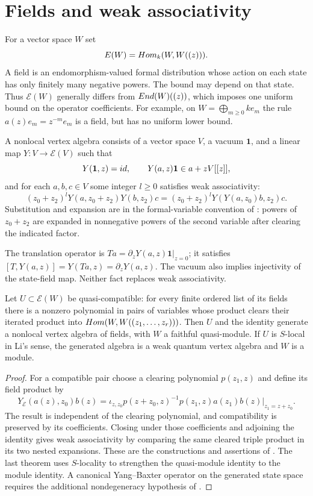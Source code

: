 \section{Fields and weak associativity}
For a vector space $W$ set
\[
 E(W)=Hom_k(W,W((z))).
\]
A field is an endomorphism-valued formal distribution whose action on each
state has only finitely many negative powers. The bound may depend on that state.
Thus $\mathcal E(W)$ generally differs from $End(W)((z))$, which imposes one
uniform bound on the operator coefficients.
For example, on $W=\bigoplus_{m\ge0}ke_m$ the rule
$a(z)e_m=z^{-m}e_m$ is a field, but has no uniform lower bound.

\begin{definition}
A nonlocal vertex algebra consists of a vector space $V$, a vacuum $\mathbf1$,
and a linear map $Y:V\to\mathcal E(V)$ such that
\[
 Y(\mathbf1,z)=id,
 \qquad Y(a,z)\mathbf1\in a+zV[[z]],
\]
and for each $a,b,c\in V$ some integer $l\ge0$ satisfies weak associativity:
\[
 (z_0+z_2)^lY(a,z_0+z_2)Y(b,z_2)c
 =(z_0+z_2)^lY(Y(a,z_0)b,z_2)c.
\]
Substitution and expansion are in the formal-variable convention of
\cite[Definition~2.3]{LiNonlocal}: powers of $z_0+z_2$ are expanded in
nonnegative powers of the second variable after clearing the indicated factor.
\end{definition}

The translation operator is
$Ta=\left.\partial_zY(a,z)\mathbf1\right|_{z=0}$; it satisfies
$[T,Y(a,z)]=Y(Ta,z)=\partial_zY(a,z)$.
The vacuum also implies injectivity of the state-field map.
Neither fact replaces weak associativity.

\begin{theorem}
Let $U\subset\mathcal E(W)$ be quasi-compatible: for every finite ordered
list of its fields there is a nonzero polynomial in pairs of variables whose
product clears their iterated product into
$Hom(W,W((z_1,\ldots,z_r)))$.
Then $U$ and the identity generate a nonlocal vertex algebra of fields, with
$W$ a faithful quasi-module. If $U$ is $S$-local in Li's sense, the generated
algebra is a weak quantum vertex algebra and $W$ is a module.
\end{theorem}
\begin{proof}
For a compatible pair choose a clearing polynomial $p(z_1,z)$ and define its
field product by
\[
 Y_{\mathcal E}(a(z),z_0)b(z)
 =\iota_{z,z_0}p(z+z_0,z)^{-1}
   \left.p(z_1,z)a(z_1)b(z)\right|_{z_1=z+z_0}.
\]
The result is independent of the clearing polynomial, and compatibility is
preserved by its coefficients. Closing under those coefficients and adjoining
the identity gives weak associativity by comparing the same cleared triple
product in its two nested expansions.
These are the constructions and assertions of
\cite[Theorems~2.17, 2.20 and 5.8]{LiNonlocal}.
The last theorem uses $S$-locality to strengthen the quasi-module identity to
the module identity. A canonical Yang--Baxter operator on the generated
state space requires the additional nondegeneracy hypothesis of
\cite[Theorem~5.11 and Corollary~5.13]{LiNonlocal}.
\end{proof}

